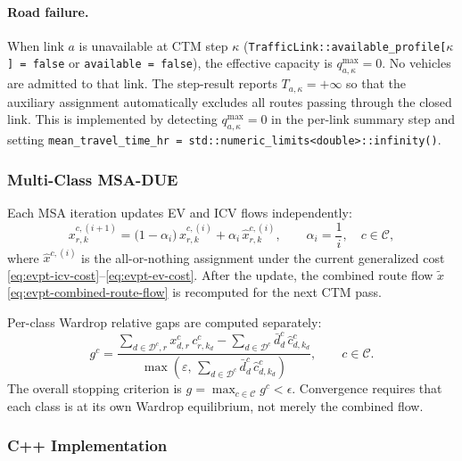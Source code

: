\paragraph{Road failure.}
When link \(a\) is unavailable at CTM step \(\kappa\)
(\texttt{TrafficLink::available\_profile[}\(\kappa\)\texttt{] = false} or
\texttt{available = false}), the effective capacity is \(q^{\max}_{a,\kappa}=0\).
No vehicles are admitted to that link. The step-result reports
\(T_{a,\kappa}=+\infty\) so that the auxiliary assignment automatically excludes
all routes passing through the closed link. This is implemented by detecting
\(q^{\max}_{a,\kappa}=0\) in the per-link summary step and setting
\texttt{mean\_travel\_time\_hr = std::numeric\_limits<double>::infinity()}.

\subsubsection{Multi-Class MSA-DUE}

Each MSA iteration updates EV and ICV flows independently:
\begin{equation}
  x^{c,(i+1)}_{r,k}
  = \bigl(1-\alpha_i\bigr)\,x^{c,(i)}_{r,k}
  + \alpha_i\,\hat{x}^{c,(i)}_{r,k},
  \qquad \alpha_i=\frac{1}{i},\quad c\in\mathcal{C},
  \label{eq:evpt-multiclass-msa}
\end{equation}
where \(\hat{x}^{c,(i)}\) is the all-or-nothing assignment under the
current generalized cost \eqref{eq:evpt-icv-cost}--\eqref{eq:evpt-ev-cost}.
After the update, the combined route flow \(\tilde{x}\)
\eqref{eq:evpt-combined-route-flow} is recomputed for the next CTM pass.

Per-class Wardrop relative gaps are computed separately:
\begin{equation}
  g^c
  = \frac{\displaystyle\sum_{d\in\mathcal{D}^c,r}
    x^c_{d,r}\,c^c_{r,k_d}
    -\sum_{d\in\mathcal{D}^c}\bar d^c_d\,\hat{c}^c_{d,k_d}}
    {\displaystyle\max\!\left(\varepsilon,\,\sum_{d\in\mathcal{D}^c}\bar d^c_d\,\hat{c}^c_{d,k_d}\right)},
  \qquad c\in\mathcal{C}.
  \label{eq:evpt-perclass-gap}
\end{equation}
The overall stopping criterion is \(g=\max_{c\in\mathcal{C}}g^c<\epsilon\).
Convergence requires that each class is at its own Wardrop equilibrium,
not merely the combined flow.

\subsubsection{C++ Implementation}

